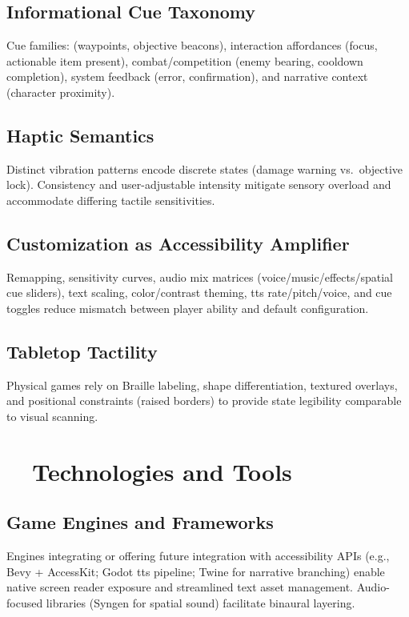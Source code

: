 \subsection*{Informational Cue Taxonomy}
Cue families:  (waypoints, objective beacons), interaction affordances (focus, actionable item present), combat/competition (enemy bearing, cooldown completion), system feedback (error, confirmation), and narrative context (character proximity).

\subsection*{Haptic Semantics}
Distinct vibration patterns encode discrete states (damage warning vs.\ objective lock). Consistency and user-adjustable intensity mitigate sensory overload and accommodate differing tactile sensitivities.

\subsection*{Customization as Accessibility Amplifier}
Remapping, sensitivity curves, audio mix matrices (voice/music/effects/spatial cue sliders), text scaling, color/contrast theming, \gls{tts} rate/pitch/voice, and cue toggles reduce mismatch between player ability and default configuration\supercite{Wayline2025}.

\subsection*{Tabletop Tactility}
Physical games rely on Braille labeling, shape differentiation, textured overlays, and positional constraints (raised borders) to provide state legibility comparable to visual scanning.

\section{~~Technologies and Tools}
\label{sec:gaming-technologies}
\subsection*{Game Engines and Frameworks}
Engines integrating or offering future integration with accessibility APIs (e.g., Bevy + AccessKit; Godot \gls{tts} pipeline; Twine for narrative branching)\supercite{GitHubGameEngines} enable native screen reader exposure and streamlined text asset management. Audio-focused libraries (Syngen for spatial sound) facilitate binaural layering.

